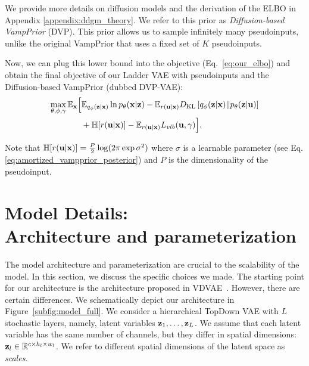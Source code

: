 We provide more details on diffusion models and the derivation of the ELBO in Appendix \ref{appendix:ddgm_theory}. We refer to this prior as \textit{Diffusion-based VampPrior} (DVP). This prior allows us to sample infinitely many pseudoinputs, unlike the original VampPrior that uses a fixed set of $K$ pseudoinputs.

Now, we can plug this lower bound into the objective (Eq.~\ref{eq:our_elbo}) and obtain the final objective of our Ladder VAE with pseudoinputs and the Diffusion-based VampPrior (dubbed DVP-VAE):
\begin{equation}\label{eq:5_dvp_our_elbo_final}
\begin{aligned}
    \max_{\theta, \phi, \gamma}\E_{\rvx} \Bigl[
     &\E_{\Enc{\rvz}{\rvx}} \ln \Dec{\rvx}{\rvz} 
     - \E_{r(\rvu|\rvx)}\KL{q_{\phi}(\rvz|\rvx)}{p_{\theta}(\rvz|\rvu)} \\
     &+ \mathbb{H}[r(\rvu|\rvx)] 
     - \E_{r(\rvu|\rvx)} L_{vlb}(\rvu, \gamma)\Bigr].
\end{aligned}
\end{equation}


Note that $\mathbb{H}[r({\mathbf{u}}|{\mathbf{x}})] = \frac{P}{2}\log(2\pi \exp \sigma^2)$ where $\sigma$ is a learnable parameter (see Eq. \ref{eq:amortized_vampprior_posterior}) and $P$ is the dimensionality of the pseudoinput.

\section{Model Details: \\ Architecture and parameterization} \label{sec:architecture}

The model architecture and parameterization are crucial to the scalability of the model. In this section, we discuss the specific choices we made.
The starting point for our architecture is the architecture proposed in VDVAE~\citep{Child2020-ze}. However, there are certain differences. We schematically depict our architecture in Figure~\ref{subfig:model_full}. We consider a hierarchical TopDown VAE with $L$ stochastic layers, namely, latent variables ${\mathbf{z}}_1, \dots, {\mathbf{z}}_L$. We assume that each latent variable has the same number of channels, but they differ in spatial dimensions: ${\mathbf{z}}_l \in \mathbb{R}^{c \times h_l \times w_l}$. We refer to different spatial dimensions of the latent space as \textit{scales}.

